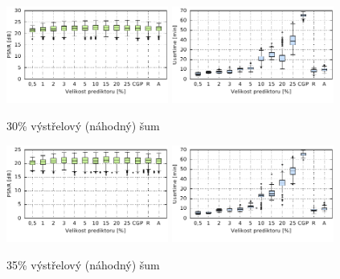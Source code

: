 \begin{figure}[H]
    \centering
    \includegraphics[width=0.475\textwidth]{fig/plot/compare/impulse30-100kg-psnrtest.pdf}
    \hskip0.5cm
    \includegraphics[width=0.475\textwidth]{fig/plot/compare/impulse30-100kg-usertime.pdf}
    \caption{30\% výstřelový (náhodný) šum}
\end{figure}

\begin{figure}[H]
    \centering
    \includegraphics[width=0.475\textwidth]{fig/plot/compare/impulse35-100kg-psnrtest.pdf}
    \hskip0.5cm
    \includegraphics[width=0.475\textwidth]{fig/plot/compare/impulse35-100kg-usertime.pdf}
    \caption{35\% výstřelový (náhodný) šum}
\end{figure}


